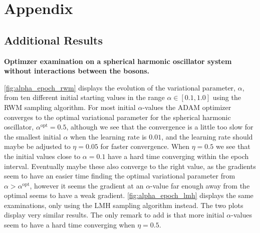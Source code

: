 \section{Appendix}\label{sec:Appendix A}

\subsection{Additional Results}\label{app:additional_results}

\textbf{Optimzer examination on a spherical harmonic oscillator system without interactions between the bosons.}

\autoref{fig:alpha_epoch_rwm} displays the evolution of the variational parameter, $\alpha$, from ten different initial starting values in the range $\alpha\in[0.1, 1.0]$ using the RWM sampling algorithm. For most initial $\alpha$-values the ADAM optimizer converges to the optimal variational parameter for the spherical harmonic oscillator, $\alpha^{\mathrm{opt}}=0.5$, although we see that the convergence is a little too slow for the smallest initial $\alpha$ when the learning rate is $0.01$, and the learning rate should maybe be adjusted to $\eta = 0.05$ for faster convergence. When $\eta=0.5$ we see that the initial values close to $\alpha=0.1$ have a hard time converging within the epoch interval. Eventually maybe these also converge to the right value, as the gradients seem to have an easier time finding the optimal variational parameter from $\alpha>\alpha^{\mathrm{opt}}$, however it seems the gradient at an $\alpha$-value far enough away from the optimal seems to have a weak gradient. \autoref{fig:alpha_epoch_lmh} displays the same examinations, only using the LMH sampling algorithm instead. The two plots display very similar results. The only remark to add is that more initial $\alpha$-values seem to have a hard time converging when $\eta=0.5$. 

